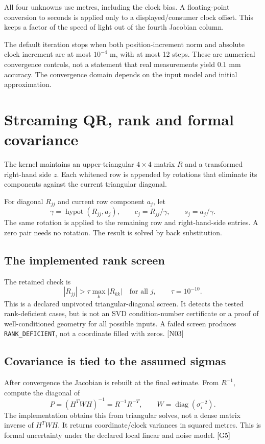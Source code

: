 \documentclass[11pt,a4paper]{article}
\newcommand{\code}[1]{\texttt{#1}}
\newcommand{\ext}[1]{\textcolor{muted}{[#1]}}
\newcommand{\dec}[1]{\textcolor{accent}{[N#1]}}
\begin{document}
All four unknowns use metres, including the clock bias. A floating-point conversion
to seconds is applied only to a displayed/consumer clock offset. This keeps a factor
of the speed of light out of the fourth Jacobian column.

The default iteration stops when both position-increment norm and absolute clock
increment are at most $10^{-4}$ m, with at most 12 steps. These are numerical
convergence controls, not a statement that real measurements yield $0.1$ mm accuracy.
The convergence domain depends on the input model and initial approximation.
\clearpage

\section{Streaming QR, rank and formal covariance}
The kernel maintains an upper-triangular $4\times4$ matrix $R$ and a transformed
right-hand side $z$. Each whitened row is appended by rotations that eliminate its
components against the current triangular diagonal.

For diagonal $R_{jj}$ and current row component $a_j$, let
\begin{equation}
\gamma=\operatorname{hypot}(R_{jj},a_j),\qquad c_j=R_{jj}/\gamma,
\qquad s_j=a_j/\gamma.
\end{equation}
The same rotation is applied to the remaining row and right-hand-side entries. A zero
pair needs no rotation. The result is solved by back substitution.

\subsection{The implemented rank screen}
The retained check is
\begin{equation}
|R_{jj}|>\tau\max_k|R_{kk}|\quad\text{for all }j,
\qquad\tau=10^{-10}.
\end{equation}
This is a declared unpivoted triangular-diagonal screen. It detects the tested
rank-deficient cases, but is not an SVD condition-number certificate or a proof of
well-conditioned geometry for all possible inputs. A failed screen produces
\code{RANK\_DEFICIENT}, not a coordinate filled with zeros. \dec{03}

\subsection{Covariance is tied to the assumed sigmas}
After convergence the Jacobian is rebuilt at the final estimate. From $R^{-1}$,
compute the diagonal of
\begin{equation}
P=(H^TWH)^{-1}=R^{-1}R^{-T},\qquad
W=\operatorname{diag}(\sigma_i^{-2}).
\end{equation}
The implementation obtains this from triangular solves, not a dense matrix inverse
of $H^TWH$. It returns coordinate/clock variances in squared metres. This is formal
uncertainty under the declared local linear and noise model. \ext{G5}
\end{document}
